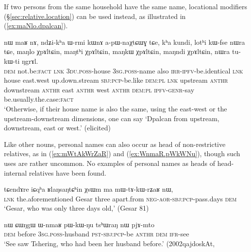 If  two persons from the same household have the same name, locational modifiers (§\ref{sec:relative.location}) can be used instead, as illustrated in (\ref{ex:maNlo.dpalcan}).

\begin{exe}
\ex \label{ex:maNlo.dpalcan}
\gll  nɯ maʁ nɤ, ndʑi-kʰa ɯ-rmi kɯnɤ a-pɯ-naχtɕɯɣ tɕe, kʰa kundi, lotʰi kɯ-fse nɯra tɕe, 
maŋlo χpɤltɕin, maŋtʰi χpɤltɕin, maŋkɯ χpɤltɕin, maŋndi χpɤltɕin, nɯra tu-kɯ-ti ŋgrɤl. \\
\textsc{dem} not.be:\textsc{fact} \textsc{lnk} \textsc{3du}.\textsc{poss}-house \textsc{3sg}.\textsc{poss}-name also \textsc{irr}-\textsc{ipfv}-be.identical \textsc{lnk} house east.west up.down.stream \textsc{sbj}:\textsc{pcp}-be.like \textsc{dem}:\textsc{pl} \textsc{lnk} upstream  \textsc{anthr} downstream  \textsc{anthr} east  \textsc{anthr} west  \textsc{anthr} \textsc{dem}:\textsc{pl} \textsc{ipfv}-\textsc{genr}-say be.usually.the.case:\textsc{fact} \\
\glt `Otherwise, if their house name is also the same, using the east-west or the upstream-downstream dimensions, one can say `Dpalcan from upstream, downstream, east or west.' (elicited)
\end{exe}

Like other nouns, personal names can also occur as head of non-restrictive relatives, as in  (\ref{ex:mWtAkWrZaR}) and (\ref{ex:WnmaR.pWkWNu}), though such uses are rather uncommon. No examples of personal names as heads of head-internal relatives have been found.

  \begin{exe}
\ex \label{ex:mWtAkWrZaR}
\gll  tɕendɤre 	iɕqʰa 	ʁlaŋsaŋtɕʰin 	χsɯm 	ma 	mɯ-tɤ-kɯ-rʑaʁ 	nɯ, \\
\textsc{lnk} the.aforementioned Gesar three apart.from \textsc{neg}-\textsc{aor}-\textsc{sbj}:\textsc{pcp}-pass.days \textsc{dem} \\
\glt `Gesar, who was only three days old,'  (Gesar 81)
\end{exe}

\begin{exe}
\ex \label{ex:WnmaR.pWkWNu}
\gll nɯ ɕɯŋgɯ ɯ-nmaʁ pɯ-kɯ-ŋu tsʰɯraŋ nɯ pjɤ-mto  \\
\textsc{dem} before \textsc{3sg}.\textsc{poss}-husband \textsc{pst}-\textsc{sbj}:\textsc{pcp}-be  \textsc{anthr} \textsc{dem} \textsc{ifr}-see \\
\glt `See saw Tshering, who had been her husband before.' (2002qajdoskAt, 
\end{exe}

